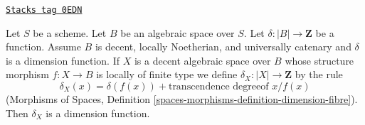\begin{lemma}
\label{spaces-more-morphisms-lemma-universally-catenary-dimension-function}
\href{https://stacks.math.columbia.edu/tag/0EDN}{\texttt{Stacks tag 0EDN}}

Let $S$ be a scheme. Let $B$ be an algebraic space over $S$.
Let $\delta : |B| \to \mathbf{Z}$ be a function.
Assume $B$ is decent, locally Noetherian, and
universally catenary and $\delta$ is a dimension function.
If $X$ is a decent algebraic space over $B$ whose structure morphism
$f : X \to B$ is locally of finite type we define
$\delta_X : |X| \to \mathbf{Z}$ by the rule
$$
\delta_X(x) = \delta(f(x)) + \text{transcendence degreeof }x/f(x)
$$
(Morphisms of Spaces, Definition
\ref{spaces-morphisms-definition-dimension-fibre}).
Then $\delta_X$ is a dimension function.
\end{lemma}


